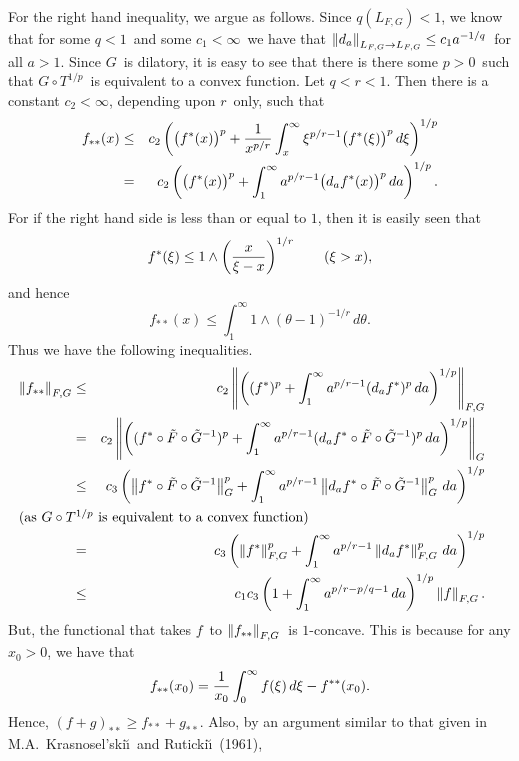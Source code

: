 For the right hand inequality, we argue as
follows. Since $q(L_{F,G}) < 1$, we know that for some $q<1$\ and some
$c_1<\infty$\ we have that $\left\| d_a \right\|_{L_{F,G}\to L_{F,G}} \le c_1 
a^{-1/q}$\
for all $a>1$. Since $G$\ is dilatory, it is easy to see that there is there
some $p>0$\ such that $G\circ T^{1/p}$\ is equivalent to a convex
function. Let $q<r<1$. Then there is a constant $c_2<\infty$, depending
upon $r$\ only, such that 
\begin{eqnarray*}
   f_{**}(x) 
   &\le& c_2 \left(\bigl(f^*(x)\bigr)^p + 
   {1\over x^{p/r}} \int_x^\infty \xi^{p/r-1} \bigl(f^*(\xi)\bigr)^p
   \,d\xi \right)^{1/p} \\
   &=& c_2 \left( \bigl(f^*(x)\bigr)^p + 
   \int_1^\infty a^{p/r-1} \bigl(d_a f^*(x)\bigr)^p
   \,da \right)^{1/p} .
\end{eqnarray*}
For if the right hand side is less than or equal to $1$, then it
is easily seen that
$$ f^*(\xi) \le 1 \wedge \left({x\over \xi -x}\right)^{1/r}
   \qquad (\xi > x) ,$$
and hence
$$ f_{**}(x) \le \int_1^\infty 1 \wedge (\theta-1)^{-1/r} \,d\theta .$$
Thus we have the following inequalities.
\begin{eqnarray*}
   \normo{f_{**}}_{F,G}
   &\le& c_2 \normo{ \left( (f^*)^p + \int_1^\infty a^{p/r-1} (d_a f^*)^p 
         \,da
         \right)^{1/p} }_{F,G} \\
   &=& c_2 \normo{ \left( (f^*\circ\tilde F\circ\tilde G^{-1})^p + 
          \int_1^\infty a^{p/r-1} 
          (d_a f^*\circ\tilde F\circ\tilde G^{-1})^p \,da \right)^{1/p}}_G \\
   &\le &c_3 \left( \normo{f^*\circ\tilde F\circ\tilde G^{-1}}_G^p +
            \int_1^\infty a^{p/r-1}
            \normo{ d_a f^*\circ\tilde F\circ\tilde G^{-1} }_G^p 
            \,da \right)^{1/p} \\
\noalign{\noindent(as $G\circ T^{1/p}$\ is equivalent to a convex function)}
   &=& c_3 \left( \normo{f^*}_{F,G}^p + 
          \int_1^\infty a^{p/r-1}
          \normo{ d_a f^*}_{F,G}^p 
          \,da \right)^{1/p} \\
   &\le& c_1 c_3 \left( 1 + \int_1^\infty a^{p/r-p/q-1} \,da \right)^{1/p}
        \normo f_{F,G} .
\end{eqnarray*}
But, the functional that takes $f$\ to $\left\| f_{**} \right\|_{F,G}$\
is $1$-concave. This is because for any $x_0>0$, we have that
$$ f_{**}(x_0) = {1\over x_0} \int_0^\infty f(\xi) \,d\xi - f^{**}(x_0) .$$ 
Hence, $(f+g)_{**} \ge f_{**} + g_{**}$.
Also, by an argument similar to that given in M.A.~Krasnosel'ski\u\i\ and 
Ruticki\u\i\ (1961), 
